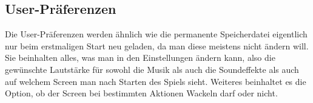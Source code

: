 \subsection{User-Präferenzen}\label{subsec:user-prefs}
Die User-Präferenzen werden ähnlich wie die permanente Speicherdatei eigentlich nur beim erstmaligen Start neu geladen, da man diese meistens nicht ändern will.
Sie beinhalten alles, was man in den Einstellungen ändern kann, also die gewünschte Lautstärke für sowohl die Musik als auch die Soundeffekte als auch auf welchem Screen man nach Starten des Spiels sieht.
Weiteres beinhaltet es die Option, ob der Screen bei bestimmten Aktionen Wackeln darf oder nicht.
